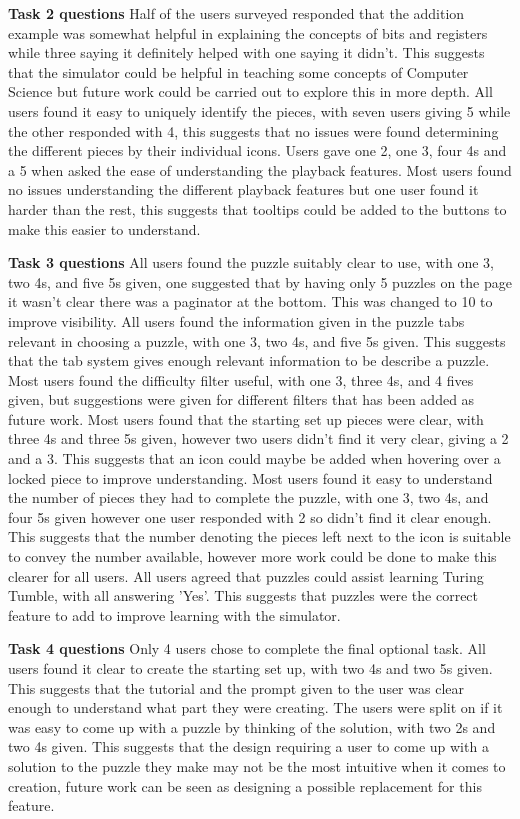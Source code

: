 \documentclass{l4proj}
\begin{document}
\textbf{Task 2 questions}
Half of the users surveyed responded that the addition example was somewhat helpful in explaining the concepts of bits and registers while three saying it definitely helped with one saying it didn't. This suggests that the simulator could be helpful in teaching some concepts of Computer Science but future work could be carried out to explore this in more depth. All users found it easy to uniquely identify the pieces, with seven users giving 5 while the other responded with 4, this suggests that no issues were found determining the different pieces by their individual icons. Users gave one 2, one 3, four 4s and a 5 when asked the ease of understanding the playback features. Most users found no issues understanding the different playback features but one user found it harder than the rest, this suggests that tooltips could be added to the buttons to make this easier to understand.   

\textbf{Task 3 questions}
All users found the puzzle suitably clear to use, with one 3, two 4s, and five 5s given, one suggested that by having only 5 puzzles on the page it wasn't clear there was a paginator at the bottom. This was changed to 10 to improve visibility. All users found the information given in the puzzle tabs relevant in choosing a puzzle, with one 3, two 4s, and five 5s given. This suggests that the tab system gives enough relevant information to be describe a puzzle. Most users found the difficulty filter useful, with one 3, three 4s, and 4 fives given, but suggestions were given for different filters that has been added as future work. Most users found that the starting set up pieces were clear, with three 4s and three 5s given, however two users didn't find it very clear, giving a 2 and a 3. This suggests that an icon could maybe be added when hovering over a locked piece to improve understanding. Most users found it easy to understand the number of pieces they had to complete the puzzle, with one 3, two 4s, and four 5s given however one user responded with 2 so didn't find it clear enough. This suggests that the number denoting the pieces left next to the icon is suitable to convey the number available, however more work could be done to make this clearer for all users. All users agreed that puzzles could assist learning Turing Tumble, with all answering 'Yes'. This suggests that puzzles were the correct feature to add to improve learning with the simulator.

\textbf{Task 4 questions}
Only 4 users chose to complete the final optional task. All users found it clear to create the starting set up, with two 4s and two 5s given. This suggests that the tutorial and the prompt given to the user was clear enough to understand what part they were creating. The users were split on if it was easy to come up with a puzzle by thinking of the solution, with two 2s and two 4s given. This suggests that the design requiring a user to come up with a solution to the puzzle they make may not be the most intuitive when it comes to creation, future work can be seen as designing a possible replacement for this feature.
\end{document}
